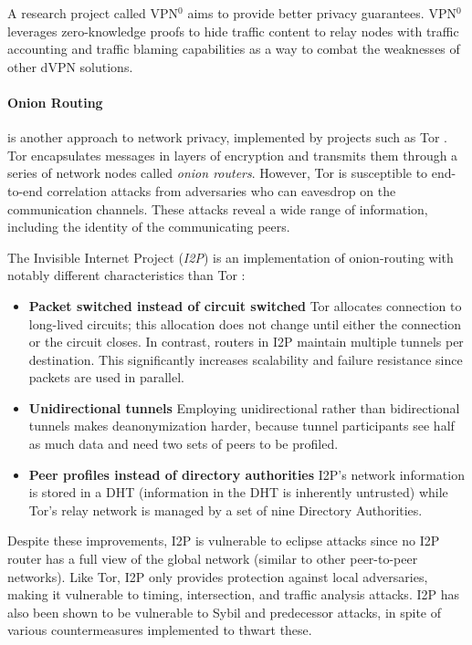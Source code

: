 A research project called VPN$^0$ \cite{vpn0} aims to provide better privacy guarantees. VPN$^0$ leverages zero-knowledge proofs to hide traffic content to relay nodes with traffic accounting and traffic blaming capabilities as a way to combat the weaknesses of other dVPN solutions.

\paragraph{Onion Routing} is another approach to network privacy, implemented by projects such as Tor \cite{tor}. Tor encapsulates messages in layers of
encryption and transmits them through a series of network nodes called \textit{onion routers}. However, Tor is susceptible to end-to-end correlation attacks from adversaries who can eavesdrop on the communication channels. These attacks reveal a wide range of information, including the identity of the communicating peers.

The Invisible Internet Project (\textit{I2P}) is an implementation of onion-routing with notably different characteristics than Tor \cite{i2p}:

\begin{itemize}

    \item \textbf{Packet switched instead of circuit switched} Tor allocates connection
        to long-lived circuits; this allocation does not change until either the
        connection or the circuit closes. In contrast, routers in I2P maintain
        multiple tunnels per destination. This significantly increases
        scalability and failure resistance since packets are used in
        parallel.

    \item \textbf{Unidirectional tunnels} Employing unidirectional rather than bidirectional tunnels makes
        deanonymization harder, because tunnel participants see half as much data
        and need two sets of peers to be profiled.

    \item \textbf{Peer profiles instead of directory authorities} I2P’s network
        information is stored in a DHT (information in the DHT is inherently
        untrusted) while Tor’s relay network is managed by a set of nine
        Directory Authorities.

\end{itemize}
Despite these improvements, I2P is vulnerable to eclipse attacks since no I2P router has a full view of the
global network (similar to other peer-to-peer networks). Like Tor, I2P only provides protection
against local adversaries, making it vulnerable to timing,
intersection, and traffic analysis attacks. I2P has also been shown to be vulnerable
to Sybil and predecessor attacks, in spite of various countermeasures
implemented to thwart these.

